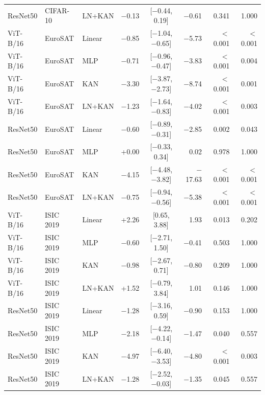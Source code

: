 \documentclass[10pt]{article}
\begin{document}
\begin{longtable}{lllrcrrr}
ResNet50 & CIFAR-10 & LN+KAN & $-$0.13 & [$-$0.44, 0.19] & $-$0.61 & 0.341 & 1.000 \\
ViT-B/16 & EuroSAT & Linear & $-$0.85 & [$-$1.04, $-$0.65] & $-$5.73 & $<$0.001 & $<$0.001 \\
ViT-B/16 & EuroSAT & MLP & $-$0.71 & [$-$0.96, $-$0.47] & $-$3.83 & $<$0.001 & 0.004 \\
ViT-B/16 & EuroSAT & KAN & $-$3.30 & [$-$3.87, $-$2.73] & $-$8.74 & $<$0.001 & 0.001 \\
ViT-B/16 & EuroSAT & LN+KAN & $-$1.23 & [$-$1.64, $-$0.83] & $-$4.02 & $<$0.001 & 0.003 \\
ResNet50 & EuroSAT & Linear & $-$0.60 & [$-$0.89, $-$0.31] & $-$2.85 & 0.002 & 0.043 \\
ResNet50 & EuroSAT & MLP & +0.00 & [$-$0.33, 0.34] & 0.02 & 0.978 & 1.000 \\
ResNet50 & EuroSAT & KAN & $-$4.15 & [$-$4.48, $-$3.82] & $-$17.63 & $<$0.001 & $<$0.001 \\
ResNet50 & EuroSAT & LN+KAN & $-$0.75 & [$-$0.94, $-$0.56] & $-$5.38 & $<$0.001 & $<$0.001 \\
ViT-B/16 & ISIC 2019 & Linear & +2.26 & [0.65, 3.88] & 1.93 & 0.013 & 0.202 \\
ViT-B/16 & ISIC 2019 & MLP & $-$0.60 & [$-$2.71, 1.50] & $-$0.41 & 0.503 & 1.000 \\
ViT-B/16 & ISIC 2019 & KAN & $-$0.98 & [$-$2.67, 0.71] & $-$0.80 & 0.209 & 1.000 \\
ViT-B/16 & ISIC 2019 & LN+KAN & +1.52 & [$-$0.79, 3.84] & 1.01 & 0.146 & 1.000 \\
ResNet50 & ISIC 2019 & Linear & $-$1.28 & [$-$3.16, 0.59] & $-$0.90 & 0.153 & 1.000 \\
ResNet50 & ISIC 2019 & MLP & $-$2.18 & [$-$4.22, $-$0.14] & $-$1.47 & 0.040 & 0.557 \\
ResNet50 & ISIC 2019 & KAN & $-$4.97 & [$-$6.40, $-$3.53] & $-$4.80 & $<$0.001 & 0.003 \\
ResNet50 & ISIC 2019 & LN+KAN & $-$1.28 & [$-$2.52, $-$0.03] & $-$1.35 & 0.045 & 0.557 \\
\end{longtable}
\vspace{-6pt}{\footnotesize Differences in Macro F1 percentage points; $g$, Hedges' $g$ (not defined for the interaction).\par}
\normalsize
\end{document}
